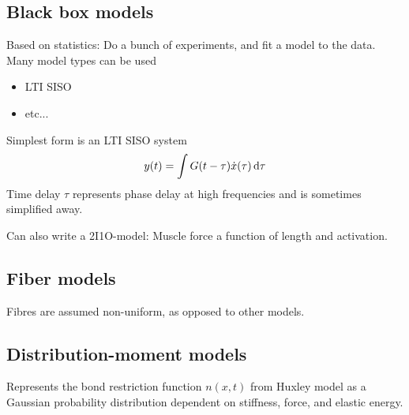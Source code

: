\subsection{Black box models}
Based on statistics: Do a bunch of experiments, and fit a model to the data. Many model types can be used
\begin{itemize}
    \item LTI SISO
    \item etc...
\end{itemize}
Simplest form is an LTI SISO system
\begin{equation}
    y(t) = \int G(t-\tau) \dot{x}(\tau) \dif \tau
\end{equation}
Time delay $\tau$ represents phase delay at high frequencies and is sometimes simplified away.

Can also write a 2I1O-model: Muscle force a function of length and activation.

\subsection{Fiber models}
Fibres are assumed non-uniform, as opposed to other models.

\subsection{Distribution-moment models}
Represents the bond restriction function $n(x,t)$ from Huxley model as a Gaussian probability distribution dependent on stiffness, force, and elastic energy.
